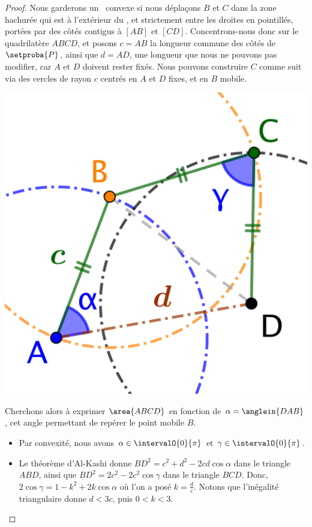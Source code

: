 \begin{proof}
    Nous garderons un \ngone\ convexe si nous déplaçons $B$ et $C$ dans la zone hachurée qui est à l'extérieur du \ngone, et strictement entre les droites en pointillés, portées par des côtés contigus à $[AB]$ et $[CD]$.
    Concentrons-nous donc sur le quadrilatère $ABCD$, et posons $c = AB$ la longueur commune des côtés de $\setproba{P}$, ainsi que $d = AD$, une longueur que nous ne pouvons pas modifier, car $A$ et $D$ doivent rester fixés.
    Nous pouvons construire $C$ comme suit via des cercles de rayon $c$ centrés en $A$ et $D$ fixes, et en $B$ mobile.
    \begin{center}
        \includegraphics[scale=.35]{content/polygon/sol-must-be/2-eq-angles-circle.png}
    \end{center}

    Cherchons alors à exprimer $\area{ABCD}$ en fonction de $\alpha = \anglein{DAB}$, cet angle permettant de repérer le point mobile $B$.
    \begin{itemize}
        \item Par convexité, nous avons $\alpha \in \intervalO{0}{\pi}$ et $\gamma \in \intervalO{0}{\pi}$.


        \item Le théorème d'Al-Kashi donne
        $BD^2 = c^2 + d^2 - 2 c d \cos \alpha$ dans le triangle $ABD$,
        ainsi que
        $BD^2 = 2 c^2 - 2 c^2 \cos \gamma$ dans le triangle $BCD$.
        Donc,
        $2 \cos \gamma = 1 - k^2 + 2 k \cos \alpha$ où l'on a posé $k = \frac{d}{c}$.
        Notons que l'inégalité triangulaire donne $d < 3 c$, puis $0 < k < 3$.



\end{itemize}
\end{proof}
